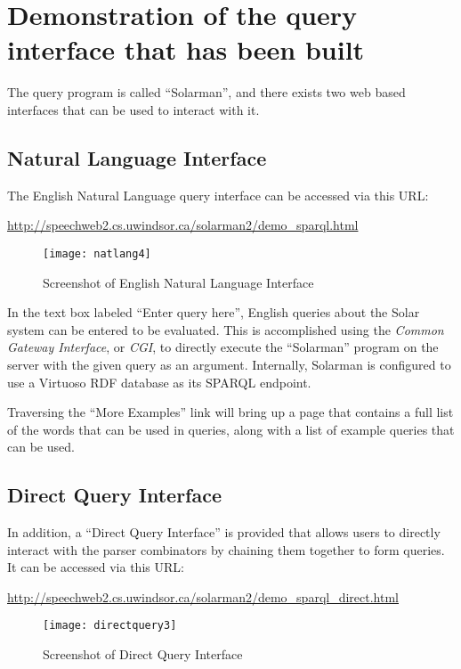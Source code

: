 \documentclass[../main.tex]{subfiles}
\begin{document}
\chapter{Demonstration of the query interface that has been built}

The query program is called ``Solarman'', and there exists two web based interfaces that can be used to interact with it.

\section{Natural Language Interface}

The English Natural Language query interface can be accessed via this URL:

\url{http://speechweb2.cs.uwindsor.ca/solarman2/demo_sparql.html}


\begin{figure}[h]
\centering
\texttt{[image: natlang4]}
\caption{Screenshot of English Natural Language Interface}
\end{figure}
In the text box labeled ``Enter query here'', English queries about the Solar system can be entered to be evaluated.  This is accomplished using the {\em Common Gateway Interface}, or {\em CGI}, to directly execute the ``Solarman'' program on the server with the given query as an argument.  Internally, Solarman is configured to use a Virtuoso \cite{virtuoso} RDF database as its SPARQL endpoint.

Traversing the ``More Examples'' link will bring up a page that contains a full list of the words that can be used in queries, along with a list of example queries that can be used.


\section{Direct Query Interface}

In addition, a ``Direct Query Interface'' is provided that allows users to directly interact with the parser combinators by chaining them together to form queries.  It can be accessed via this URL:

\url{http://speechweb2.cs.uwindsor.ca/solarman2/demo_sparql_direct.html}

\begin{figure}[h]
	\centering
	\texttt{[image: directquery3]}
	\caption{Screenshot of Direct Query Interface}
\end{figure}
\end{document}
